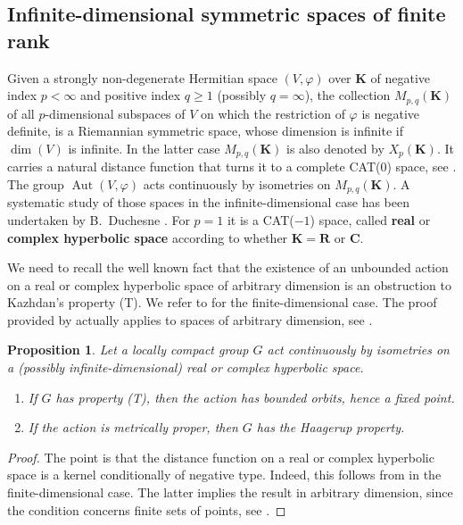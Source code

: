 \documentclass[12pt,a4paper]{amsproc}
\newtheorem{proposition}[theorem]{Proposition}
\theoremstyle{definition}
\DeclareMathOperator{\Aut}{Aut}
\newcommand{\CC}{\mathbf C}
\newcommand{\KK}{\mathbf K}
\newcommand{\RR}{\mathbf R}
\begin{document}
\subsection{Infinite-dimensional symmetric spaces of finite rank}\label{sec:sym-spaces}

Given a strongly non-degenerate Hermitian space $(V, \varphi)$ over $\KK$ of negative index  $p < \infty$ and positive index $q \geq 1$ (possibly $q =\infty$),  the collection $M_{p, q}(\KK)$ of all $p$-dimensional subspaces of $V$ on which the restriction of $\varphi$ is negative definite, is a Riemannian symmetric space, whose dimension is infinite if $\dim(V)$ is infinite. In the latter case $M_{p, q}(\KK)$ is also denoted by $X_p(\KK)$. It carries a natural distance function that turns it to a complete CAT($0$) space, see \cite[Corollary~2.5]{Duchesne}. The group $\Aut(V, \varphi)$ acts continuously by isometries on $M_{p, q}(\KK)$. A systematic study of those spaces in the infinite-dimensional case has been undertaken by B.~Duchesne \cite{DuchesnePhD, Duchesne}. For $p=1$ it is a CAT($-1$) space, called  \textbf{real} or \textbf{complex hyperbolic space} according to whether $\KK= \RR$ or $\CC$.

We need to recall the well known fact that the existence of an unbounded action on a real or complex hyperbolic space of arbitrary dimension is an obstruction to Kazhdan's property (T). We refer to  \cite[Corollary~2.7.3]{BHV} for the finite-dimensional case. The   proof provided by  \cite[Remark~2.11.4]{BHV} actually applies to spaces of arbitrary dimension, see \cite[Theorem~7.4.3]{CCJJV}. 

\begin{proposition}\label{prop:FH}
Let a locally compact group $G$ act continuously by isometries on a   (possibly infinite-dimensional) real  or complex  hyperbolic space. 
\begin{enumerate}[label=(\arabic*)]
\item If $G$ has property (T), then the action has bounded orbits, hence   a fixed point.
\item If the action is metrically proper, then $G$ has the Haagerup property. 
\end{enumerate}
	
\end{proposition}
\begin{proof}
The point is that the distance function on a real or complex hyperbolic space is a kernel conditionally of negative type. Indeed,  this follows from  \cite[Corollary~7.4]{FarHar}   in the finite-dimensional case. The latter implies the result in arbitrary dimension, since the condition concerns finite sets of points, see \cite[Theorem~7.4.3]{CCJJV}.
\end{proof}
\end{document}
